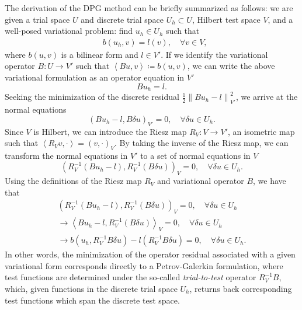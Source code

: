 \documentclass[11pt,onecolumn]{scrartcl}
\newcommand{\nor}[1]{\left\| #1 \right\|}
\newcommand{\LRp}[1]{\left( #1 \right)}
\newcommand{\LRa}[1]{\left\langle #1 \right\rangle}
\begin{document}
The derivation of the DPG method can be briefly summarized as follows: we are given a trial space $U$ and discrete trial space $U_h \subset U$, Hilbert test space $V$, and a well-posed variational problem: find $u_h\in U_h$  such that
\begin{align}
\label{variational}
&b(u_h,v) = l(v), \quad \forall v\in V, 
\end{align}
where $b(u,v)$ is a bilinear form and $l \in V'$. If we identify the variational operator $B: U\rightarrow V'$ such that $\LRa{Bu,v} \coloneqq b(u,v)$, we can write the above variational formulation as an operator equation in $V'$
\[
Bu_h = l.
\]
Seeking the minimization of the discrete residual $\frac{1}{2} \nor{Bu_h-l}^2_{V'}$, we arrive at the normal equations 
\[
\LRp{Bu_h-l,B\delta u}_{V'} = 0, \quad \forall \delta u \in U_h.  
\]
Since $V$ is Hilbert, we can introduce the Riesz map $R_V:V \rightarrow V'$, an isometric map such that $\LRa{R_V v,\cdot} = \LRp{v,\cdot}_V$. By taking the inverse of the Riesz map, we can transform the normal equations in $V'$ to a set of normal equations in $V$
\[
\LRp{R_V^{-1}\LRp{Bu_h-l},R_V^{-1}\LRp{B\delta u}}_{V} = 0, \quad \forall \delta u \in U_h.  
\]
Using the definitions of the Riesz map $R_V$ and variational operator $B$, we have that
\begin{align*}
\LRp{R_V^{-1}\LRp{Bu_h-l},R_V^{-1}\LRp{B\delta u}}_{V} = 0, \quad \forall \delta u \in U_h \\
\rightarrow \LRa{Bu_h-l,R_V^{-1}\LRp{B\delta u}}_{V} = 0, \quad \forall \delta u \in U_h \\
\rightarrow b\LRp{u_h,R_V^{-1} B\delta u} - l\LRp{R_V^{-1} B\delta u} = 0, \quad \forall \delta u \in U_h.
\end{align*}
In other words, the minimization of the operator residual associated with a given variational form corresponds directly to a Petrov-Galerkin formulation, where test functions are determined under the so-called \textit{trial-to-test} operator $R_V^{-1}B$, which, given functions in the discrete trial space $U_h$,  returns back corresponding test functions which span the discrete test space.  
\end{document}
